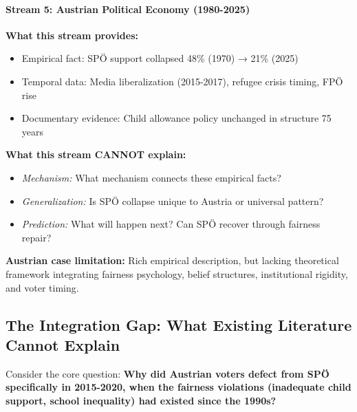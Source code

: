 \paragraph{Stream 5: Austrian Political Economy (1980-2025)}

\textbf{What this stream provides:}
\begin{itemize}[nosep]
\item Empirical fact: SPÖ support collapsed 48\% (1970) → 21\% (2025)
\item Temporal data: Media liberalization (2015-2017), refugee crisis timing, FPÖ rise
\item Documentary evidence: Child allowance policy unchanged in structure 75 years
\end{itemize}

\textbf{What this stream CANNOT explain:}
\begin{itemize}[nosep]
\item \textit{Mechanism:} What mechanism connects these empirical facts?
\item \textit{Generalization:} Is SPÖ collapse unique to Austria or universal pattern?
\item \textit{Prediction:} What will happen next? Can SPÖ recover through fairness repair?
\end{itemize}

\textbf{Austrian case limitation:} Rich empirical description, but lacking theoretical framework
integrating fairness psychology, belief structures, institutional rigidity, and voter timing.

\subsection{The Integration Gap: What Existing Literature Cannot Explain}

Consider the core question: \textbf{Why did Austrian voters defect from SPÖ specifically in 2015-2020,
when the fairness violations (inadequate child support, school inequality) had existed since the 1990s?}

